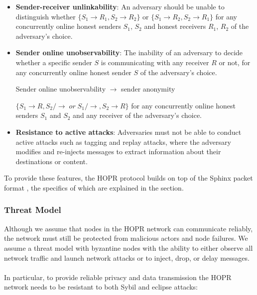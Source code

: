 \begin{itemize}

    \item \textbf{Sender-receiver unlinkability}: An adversary should be unable
        to distinguish whether $\{S_1\rightarrow R_1, S_2\rightarrow R_2\}$ or
        $\{S_1\rightarrow R_2, S_2\rightarrow R_1\}$ for any concurrently online
        honest senders $S_1$, $S_2$ and honest receivers $R_1$, $R_2$ of the
        adversary’s choice.
      \item \textbf{Sender online unobservability}: The inability of an adversary to decide whether a specific sender $S$ is communicating with any receiver $R$ or not, for any concurrently online honest sender $S$ of the adversary’s choice.
    \begin{center}
    Sender online unobservability $\rightarrow$ sender anonymity 
    \end{center} 
    $\{S_1 \rightarrow R,S_2 /\rightarrow \;or\; S_1 /\rightarrow,S_2 \rightarrow R\}$ for any concurrently online honest senders $S_1$ and $S_2$ and any receiver of the adversary’s choice. 
        

    \item \textbf{Resistance to active attacks}: Adversaries must not be able to conduct active attacks
        such as tagging and replay attacks, where the adversary modifies and
        re-injects messages to extract information about their destinations or
        content.

\end{itemize}
To provide these features, the HOPR protocol builds on top of the Sphinx packet format \cite{sphinxpaper}, the specifics of which are explained
in the  section.


\subsubsection{Threat Model}

Although we assume that nodes in the HOPR network can communicate reliably, the
network must still be protected from malicious actors and node failures. We assume a
threat model with byzantine nodes with the ability to either observe all network
traffic and launch network attacks or to inject, drop, or delay messages. \\~\\In particular, to provide reliable privacy and data transmission the HOPR network needs to be resistant to both Sybil and eclipse attacks:

